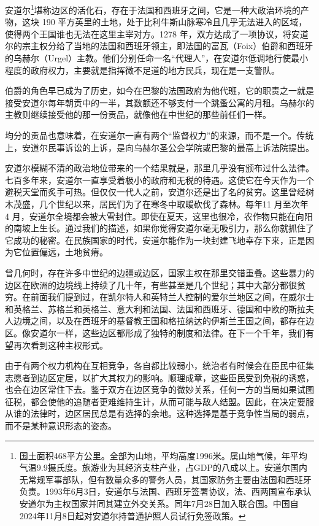 安道尔\footnote{国土面积468平方公里。全部为山地，平均高度1996米。属山地气候，年平均气温9.9摄氏度。旅游业为其经济支柱产业，占GDP的八成以上。安道尔国内无常规军事部队，但有数量众多的警务人员，其国家防务主要由法国和西班牙负责。1993年6月3日，安道尔与法国、西班牙签署协议，法、西两国宣布承认安道尔为主权国家并同其建立外交关系。同年7月28日加入联合国。中国自2024年11月8日起对安道尔持普通护照人员试行免签政策。}堪称边区的活化石，存在于法国和西班牙之间，它是一种大政治环境的产物，这块 190 平方英里的土地，处于比利牛斯山脉寒冷且几乎无法进入的区域，使得两个王国谁也无法在这里主宰对方。1278 年，双方达成了一项协议，将安道尔的宗主权分给了当地的法国和西班牙领主，即法国的富瓦（Foix）伯爵和西班牙的乌赫尔（Urgel）主教。他们分别任命一名“代理人”，在安道尔低调地行使最小程度的政府权力，主要就是指挥微不足道的地方民兵，现在是一支警队。

伯爵的角色早已成为了历史，如今在巴黎的法国政府为他代班，它的职责之一就是接受安道尔每年朝贡中的一半，其数额还不够支付一个跳蚤公寓的月租。乌赫尔的主教则继续接受他的那一份贡品，就像他在中世纪的那些前任们一样。

均分的贡品也意味着，在安道尔一直有两个“监督权力”的来源，而不是一个。传统上，安道尔民事诉讼的上诉，是向乌赫尔圣公会学院或巴黎的最高上诉法院提出。

安道尔模糊不清的政治地位带来的一个结果就是，那里几乎没有颁布过什么法律。七百多年来，安道尔一直享受着极小的政府和无税的待遇。这使它在今天作为一个避税天堂而炙手可热。但仅仅一代人之前，安道尔还是出了名的贫穷。这里曾经树木茂盛，几个世纪以来，居民们为了在寒冬中取暖砍伐了森林。每年11 月至次年 4 月，安道尔全境都会被大雪封住。即使在夏天，这里也很冷，农作物只能在向阳的南坡上生长。通过我们的描述，如果你觉得安道尔毫无吸引力，那么你就抓住了它成功的秘密。在民族国家的时代，安道尔能作为一块封建飞地幸存下来，正是因为它位置偏远，土地贫瘠。

曾几何时，存在许多中世纪的边疆或边区，国家主权在那里交错重叠。这些暴力的边区在欧洲的边境线上持续了几十年，有些甚至是几个世纪；其中大部分都很贫穷。在前面我们提到过，在凯尔特人和英特兰人控制的爱尔兰地区之间，在威尔士和英格兰、苏格兰和英格兰、意大利和法国、法国和西班牙、德国和中欧的斯拉夫人边境之间，以及在西班牙的基督教王国和格拉纳达的伊斯兰王国之间，都存在边区。像安道尔一样，这些边区都形成了独特的制度和法律。在下一个千年，我们有望再次看到这种主权形式。

由于有两个权力机构在互相竞争，各自都比较弱小，统治者有时候会在臣民中征集志愿者到边区定居，以扩大其权力的影响。顺理成章，这些臣民受到免税的诱惑，也会在边区常住下去。鉴于双方在边区竞争的微妙关系，任何一方的当局如果试图征税，都会使他的追随者更难维持生计，从而可能与敌人结盟。因此，在决定要服从谁的法律时，边区居民总是有选择的余地。这种选择是基于竞争性当局的弱点，而不是某种意识形态的姿态。

